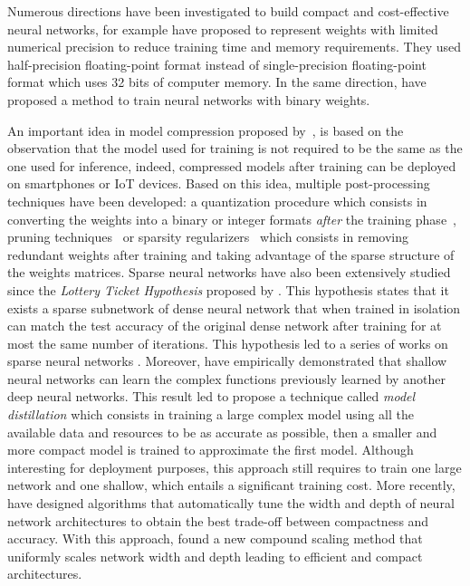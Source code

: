 Numerous directions have been investigated to build compact and cost-effective neural networks, for example \citet{gupta2015deep,micikevicius2018mixed} have proposed to represent weights with limited numerical precision to reduce training time and memory requirements.
They used half-precision floating-point format instead of single-precision floating-point format which uses 32 bits of computer memory.
In the same direction, \citet{courbariaux2015binaryconnect} have proposed a method to train neural networks with binary weights.

An important idea in model compression proposed by~\citet{bucilua2006model}, is based on the observation that the model used for training is not required to be the same as the one used for inference, indeed, compressed models after training can be deployed on smartphones or IoT devices.
Based on this idea, multiple post-processing techniques have been developed: a quantization procedure which consists in converting the weights into a binary or integer formats \emph{after} the training phase~\cite{mellempudi2017ternary,rastegariECCV16}, pruning techniques~\cite{dai2018compressing,han2015deep,lin2017runtime} or sparsity regularizers~\cite{collins2014memory,dai2018compressing,liu2015sparse} which consists in removing redundant weights after training and taking advantage of the sparse structure of the weights matrices.
Sparse neural networks have also been extensively studied since the \emph{Lottery Ticket Hypothesis} proposed by \citet{frankle2018lottery}.
This hypothesis states that it exists a sparse subnetwork of dense neural network that when trained in isolation can match the test accuracy of the original dense network after training for at most the same number of iterations. 
This hypothesis led to a series of works on sparse neural networks \cite{zhou2019deconstructing,malach2019proving,evci2020rigging}.
Moreover, \citet{ba2014deep} have empirically demonstrated that shallow neural networks can learn the complex functions previously learned by another deep neural networks.
This result led \citet{hinton2015distilling} to propose a technique called \emph{model distillation} which consists in training a large complex model using all the available data and resources to be as accurate as possible, then a smaller and more compact model is trained to approximate the first model.
Although interesting for deployment purposes, this approach still requires to train one large network and one shallow, which entails a significant training cost.
More recently, \citet{zoph2018learning,real2019regularized} have designed algorithms that automatically tune the width and depth of neural network architectures to obtain the best trade-off between compactness and accuracy.
With this approach, \citet{tan2019efficientnet} found a new compound scaling method that uniformly scales network width and depth leading to efficient and compact architectures.


